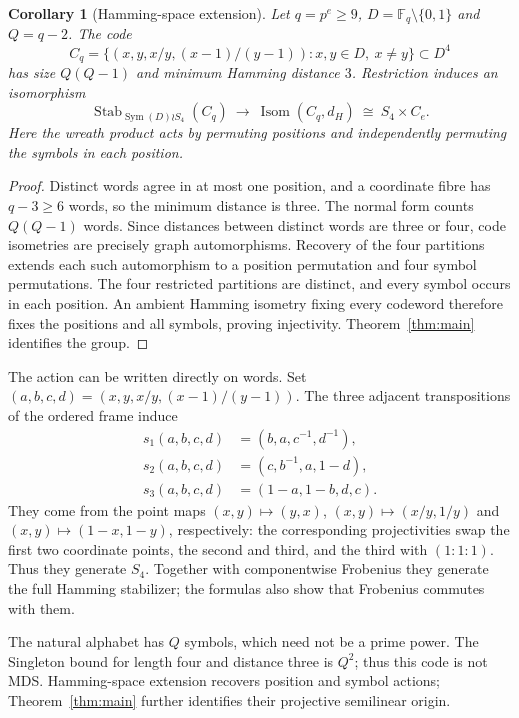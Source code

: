 \documentclass[11pt]{article}
\newtheorem{corollary}[theorem]{Corollary}
\theoremstyle{definition}
\theoremstyle{remark}
\newcommand{\F}{\mathbb F}
\newcommand{\Stab}{\operatorname{Stab}}
\begin{document}
\begin{corollary}[Hamming-space extension]\label{cor:code-extension}
Let $q=p^e\ge9$, $D=\F_q\setminus\{0,1\}$ and $Q=q-2$. The code
\[
 C_q=\{(x,y,x/y,(x-1)/(y-1)):x,y\in D,\ x\ne y\}\subset D^4
\]
has size $Q(Q-1)$ and minimum Hamming distance $3$. Restriction induces
an isomorphism
\[
 \Stab_{\operatorname{Sym}(D)\wr S_4}(C_q)
 \ \longrightarrow\ \operatorname{Isom}(C_q,d_H)
 \ \cong\ S_4\times C_e.
\]
Here the wreath product acts by permuting positions and independently
permuting the symbols in each position.
\end{corollary}
\begin{proof}
Distinct words agree in at most one position, and a coordinate fibre has
$q-3\ge6$ words, so the minimum distance is three. The normal form counts
$Q(Q-1)$ words. Since distances between distinct words are three or four,
code isometries are precisely graph automorphisms. Recovery of the four
partitions extends each such automorphism to a position permutation and
four symbol permutations. The four restricted partitions are distinct,
and every symbol occurs in each position. An ambient Hamming isometry
fixing every codeword therefore fixes the positions and all symbols,
proving injectivity. Theorem~\ref{thm:main} identifies the group.
\end{proof}

The action can be written directly on words. Set
$(a,b,c,d)=(x,y,x/y,(x-1)/(y-1))$. The three adjacent transpositions
of the ordered frame induce
\[
\begin{aligned}
 s_1(a,b,c,d)&=(b,a,c^{-1},d^{-1}),\\
 s_2(a,b,c,d)&=(c,b^{-1},a,1-d),\\
 s_3(a,b,c,d)&=(1-a,1-b,d,c).
\end{aligned}
\]
They come from the point maps $(x,y)\mapsto(y,x)$,
$(x,y)\mapsto(x/y,1/y)$ and $(x,y)\mapsto(1-x,1-y)$, respectively:
the corresponding projectivities swap the first two coordinate points,
the second and third, and the third with $(1:1:1)$. Thus they generate
$S_4$. Together with componentwise Frobenius they generate the full
Hamming stabilizer; the formulas also show that Frobenius commutes with them.

The natural alphabet has $Q$ symbols, which need not be a prime power.
The Singleton bound for length four and distance three is $Q^2$;
thus this code is not MDS. Hamming-space extension recovers position and
symbol actions; Theorem~\ref{thm:main} further identifies their projective
semilinear origin.
\end{document}
